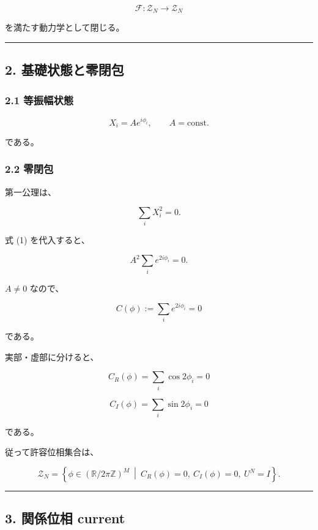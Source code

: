 \documentclass[
  a4paper,
]{ltjsarticle}
\begin{document}
\[
\boxed{
\mathcal F:
\mathcal Z_N\to\mathcal Z_N
}
\]

を満たす動力学として閉じる。

\begin{center}\rule{0.5\linewidth}{0.5pt}\end{center}

\subsection{2.
基礎状態と零閉包}\label{ux57faux790eux72b6ux614bux3068ux96f6ux9589ux5305}

\subsubsection{2.1 等振幅状態}\label{ux7b49ux632fux5e45ux72b6ux614b}

\[
\boxed{
X_i=Ae^{i\phi_i},
\qquad
A=\mathrm{const.}
}
\tag{1}
\]

である。

\subsubsection{2.2 零閉包}\label{ux96f6ux9589ux5305}

第一公理は、

\[
\sum_iX_i^2=0.
\]

式 (1) を代入すると、

\[
A^2\sum_i e^{2i\phi_i}=0.
\]

\(A\neq0\) なので、

\[
\boxed{
C(\phi)
:=
\sum_i e^{2i\phi_i}
=
0
}
\tag{2}
\]

である。

実部・虚部に分けると、

\[
\boxed{
C_R(\phi)
=
\sum_i\cos2\phi_i
=
0
}
\tag{3}
\]

\[
\boxed{
C_I(\phi)
=
\sum_i\sin2\phi_i
=
0
}
\tag{4}
\]

である。

従って許容位相集合は、

\[
\boxed{
\mathcal Z_N
=
\left\{
\phi
\in
(\mathbb R/2\pi\mathbb Z)^M
\ \middle|\
C_R(\phi)=0,
\ C_I(\phi)=0,
\ U^N=I
\right\}.
}
\tag{5}
\]

\begin{center}\rule{0.5\linewidth}{0.5pt}\end{center}

\subsection{3. 関係位相 current}\label{ux95a2ux4fc2ux4f4dux76f8-current}
\end{document}
